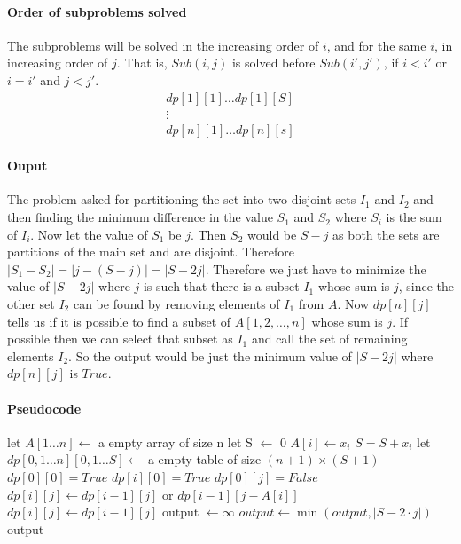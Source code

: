 \documentclass[answers]{exam}
\begin{document}
\begin{questions}
\begin{solution}
\paragraph{Order of subproblems solved}
The subproblems will be solved in the increasing order of $i$, and for the same $i$, in increasing order of $j$. That is, $Sub(i,j)$ is solved before $Sub(i',j')$, if $i<i'$ or $i=i'$ and $j<j'$.
\begin{gather*}
    dp[1][1] \ldots dp[1][S] \\
    \vdots \\
    dp[n][1] \ldots dp[n][s]
\end{gather*}

\paragraph{Ouput}
The problem asked for partitioning the set into two disjoint sets $I_1$ and $I_2$ and then finding the minimum difference in the value $S_1$ and $S_2$ where $S_i$ is the sum of $I_i$. Now let the value of $S_1$ be $j$. Then $S_2$ would be $S-j$ as both the sets are partitions of the main set and are disjoint. Therefore $|S_1-S_2| =|j-(S-j)|=|S-2j|$.
\newline Therefore we just have to minimize the value of $|S-2j|$ where $j$ is such that there is a subset $I_1$ whose sum is $j$, since the other set $I_2$ can be found by removing elements of $I_1$ from $A$.
\newline Now $dp[n][j]$ tells us if it is possible to find a subset of $A[1,2,\ldots,n]$ whose sum is $j$. If possible then we can select that subset as $I_1$ and call the set of remaining elements $I_2$.
\newline So the output would be just the minimum value of $|S-2j|$ where $dp[n][j]$ is $True$.

\paragraph{Pseudocode}
\begin{algorithmic}[1]
    \State let $A[1 \ldots n] \gets$ a empty array of size n
    \State let S $\gets$ 0
        \State $A[i] \gets x_i$
        \State $S=S+x_i$
    \EndFor
    \State let $dp[0,1 \ldots n][0,1 \ldots S] \gets$ a empty table of size $(n+1) \times (S+1)$
    \State $dp[0][0]=True$
        \State $dp[i][0]=True$
    \EndFor
        \State $dp[0][j]=False$
    \EndFor
            \State $dp[i][j] \gets dp[i-1][j] \text{ or } dp[i-1][j-A[i]]$
        \Else
            \State $dp[i][j] \gets dp[i-1][j]$
        \EndIf{}
        \EndFor
    \EndFor
    \State output $ \gets \infty$
            \State $output \gets \min(output,|S-2\cdot j|)$
    \EndIf{}
    \EndFor
    \State \Return output
\EndFunction
\end{algorithmic}

\end{solution}
\end{questions}
\end{document}

